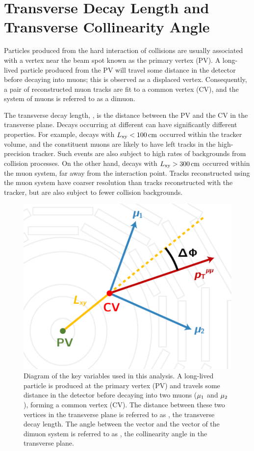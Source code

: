 \section{Transverse Decay Length and Transverse Collinearity Angle}
\label{sec:dd:keyvars}
Particles produced from the hard interaction of \pp collisions are usually associated with a vertex near the beam spot known as the primary vertex (PV).
A long-lived particle produced from the PV will travel some distance in the detector before decaying into muons; this is observed as a displaced vertex.
Consequently, a pair of reconstructed muon tracks are fit to a common vertex (CV), and the system of muons is referred to as a dimuon.

The transverse decay length, \Lxy, is the distance between the PV and the CV in the transverse plane.
Decays occurring at different \Lxy can have significantly different properties.
For example, decays with $L_{\mathrm{xy}} < 100\,\text{cm}$ occurred within the tracker volume, and the constituent muons are likely to have left tracks in the high-precision tracker.
Such events are also subject to high rates of backgrounds from \pp collision processes.
On the other hand, decays with $L_{\mathrm{xy}} > 300\,\text{cm}$ occurred within the muon system, far away from the interaction point.
Tracks reconstructed using the muon system have coarser resolution than tracks reconstructed with the tracker, but are also subject to fewer \pp collision backgrounds.

\begin{figure}[htpb]
  \centering
  \includegraphics[width=.7\textwidth]{figures/displaced/LxyDef.pdf}
  \caption[Diagram of key variables (\Lxy and \DeltaPhi) used in the analysis.]{Diagram of the key variables used in this analysis. A long-lived particle is produced at the primary vertex (PV) and travels some distance in the detector before decaying into two muons ($\mathrm{\mu}_1$ and $\mathrm{\mu}_2$), forming a common vertex (CV). The distance between these two vertices in the transverse plane is referred to as \Lxy, the transverse decay length. The angle between the \Lxy vector and the \pT vector of the dimuon system is referred to as \DeltaPhi, the collinearity angle in the transverse plane.}
  \label{fig:dd:keyvars}
\end{figure}

